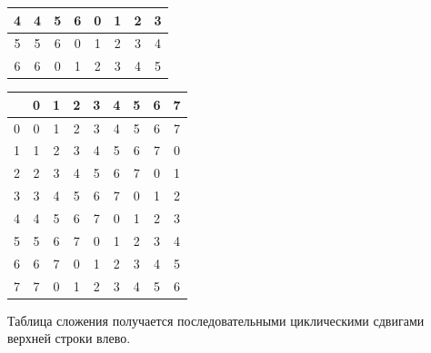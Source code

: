 \begin{enumerate}
\begin{center}
\begin{tabular}{c||c|c|c|c|c|c|c|}
4 & 4 & 5 & 6 & 0 & 1 & 2 & 3 \\ \hline
5 & 5 & 6 & 0 & 1 & 2 & 3 & 4 \\ \hline
6 & 6 & 0 & 1 & 2 & 3 & 4 & 5 \\ \hline
\end{tabular}
\quad
\begin{tabular}{c||c|c|c|c|c|c|c|c|}
  & 0 & 1 & 2 & 3 & 4 & 5 & 6 & 7 \\ \hline\hline
0 & 0 & 1 & 2 & 3 & 4 & 5 & 6 & 7 \\ \hline
1 & 1 & 2 & 3 & 4 & 5 & 6 & 7 & 0 \\ \hline
2 & 2 & 3 & 4 & 5 & 6 & 7 & 0 & 1 \\ \hline
3 & 3 & 4 & 5 & 6 & 7 & 0 & 1 & 2 \\ \hline
4 & 4 & 5 & 6 & 7 & 0 & 1 & 2 & 3 \\ \hline
5 & 5 & 6 & 7 & 0 & 1 & 2 & 3 & 4 \\ \hline
6 & 6 & 7 & 0 & 1 & 2 & 3 & 4 & 5 \\ \hline
7 & 7 & 0 & 1 & 2 & 3 & 4 & 5 & 6 \\ \hline
\end{tabular}
\end{center}
Таблица сложения получается последовательными циклическими сдвигами верхней строки влево.



\end{enumerate}
